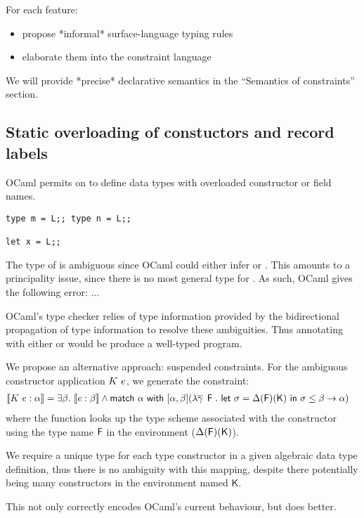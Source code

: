 \documentclass[acmsmall,screen,nonacm]{acmart}
\begin{document}
For each feature:
\begin{itemize}
\item propose *informal* surface-language typing rules
\item elaborate them into the constraint language
\end{itemize}

We will provide *precise* declarative semantics in the ``Semantics of
constraints'' section.

\subsection{Static overloading of constuctors and record labels}

OCaml permits on to define data types with overloaded constructor or field
names.
\begin{lstlisting}
type m = L;; type n = L;;

let x = L;;
\end{lstlisting}
The type of  is ambiguous since OCaml could either infer  or
. This amounts to a principality issue, since there is no most
general type for . As such, OCaml gives the following error: ...

OCaml's type checker relies of type information provided by the
bidirectional propagation of type information to resolve these
ambiguities. Thus annotating  with either  or  would
be produce a well-typed program.

We propose an alternative approach: suspended constraints. For the ambiguous
constructor application $K ~ e$, we generate the constraint:
\begin{align*}
\llbracket K ~ e : \alpha \rrbracket &= \exists {\beta}. ~ \llbracket e : \beta \rrbracket \wedge \mathsf{match} ~ \alpha ~ \mathsf{with} ~ [ \alpha, \beta ] (\lambda \overline{\gamma} \mathop{}\mathrel{\mathsf{F}}. ~ \mathsf{let} ~ \sigma = \Delta(\mathsf{F})(\mathsf{K}) ~ \mathsf{in} ~ \sigma \leq \beta \to \alpha )
\end{align*}
where the function looks up the type scheme associated with the constructor
using the type name $\mathsf{F}$ in the environment ($\Delta(\mathsf{F})(\mathsf{K})$).

We require a unique type for each type constructor in a given algebraic data
type definition, thus there is no ambiguity with this mapping, despite there
potentially being many constructors in the environment named $\mathsf{K}$.

This not only correctly encodes OCaml's current behaviour, but does better.
\end{document}
